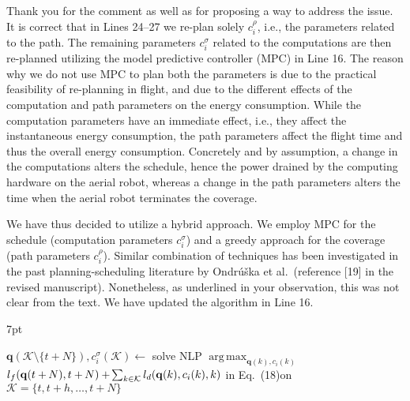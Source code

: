 \documentclass[10pt]{letter}
\DeclareMathOperator*{\argmax}{arg\,max}
\newenvironment{formal}{%
  \def\FrameCommand{%
    \hspace{1pt}%
    {\color{red}\vrule width 2pt}%
    {\color{formalshade}\vrule width 4pt}%
    \colorbox{formalshade}%
  }%
  \MakeFramed{\advance\hsize-\width\FrameRestore}%
  \noindent\hspace{-4.55pt}%
  \begin{adjustwidth}{}{7pt}%
  \vspace{2pt}\vspace{2pt}%
}
{%
  \vspace{2pt}\end{adjustwidth}\endMakeFramed%
}
\begin{document}
{\color{blue} 

{\hspace*{-4.5em}{[R1:2]}\vspace*{-1.9em}}

Thank you for the comment as well as for proposing a way to address the issue. It is correct that in Lines 24--27 we re-plan solely $c_i^\rho$, i.e., the parameters related to the path. The remaining parameters $c_i^\sigma$ related to the computations are then re-planned utilizing the model predictive controller (MPC) in Line 16. The reason why we do not use MPC to plan both the parameters is due to the practical feasibility of re-planning in flight, %
and due to the different effects of the computation and path parameters on the energy consumption. While the computation parameters have an immediate effect, i.e., they affect the instantaneous energy consumption, the path parameters affect the flight time and thus the overall energy consumption. Concretely and by assumption, a change in the computations alters the schedule, hence the power drained by the computing hardware on the aerial robot, whereas a change in the path parameters alters the time when the aerial robot terminates the coverage.

We have thus decided to utilize a hybrid approach. We employ MPC for the schedule (computation parameters $c_i^\sigma$) and a greedy approach for the coverage (path parameters $c_i^\rho$). Similar combination of techniques has been investigated in the past planning-scheduling literature by Ondr\'{u}\v{s}ka et al.~(reference [{\color{green}19}] in the revised manuscript).
Nonetheless, as underlined in your observation, this was not clear from the text. We have updated the algorithm in Line 16.

\begin{formal}
\begin{algorithmic}[1]
  \small
    \makeatletter
    \setcounter{ALC@line}{15}
    \makeatother
    \color{blue}\STATE $\mathbf{q}(\mathcal{K}\setminus\{t+N\}),c_i^\sigma(\mathcal{K})\gets${ \vspace*{.3ex}solve NLP }$\argmax_{\mathbf{q}(k),c_i(k)}$\newline \vspace*{.7ex}\hspace*{1em}${l_f(\mathbf{q}(t+\hspace*{-.1ex}N),t+\hspace*{-.1ex}N)}+\hspace*{-.2ex}{\sum_{k\in\mathcal{K}}{l_d(\mathbf{q}(k),c_i(k),k)}}${ in Eq.~({\color{red}18})\newline \hspace*{1em}on }$\mathcal{K}=\{t,t+h,\dots,t+N\}$\vspace*{.3ex}
      

\end{algorithmic}
\end{formal}}
\end{document}
